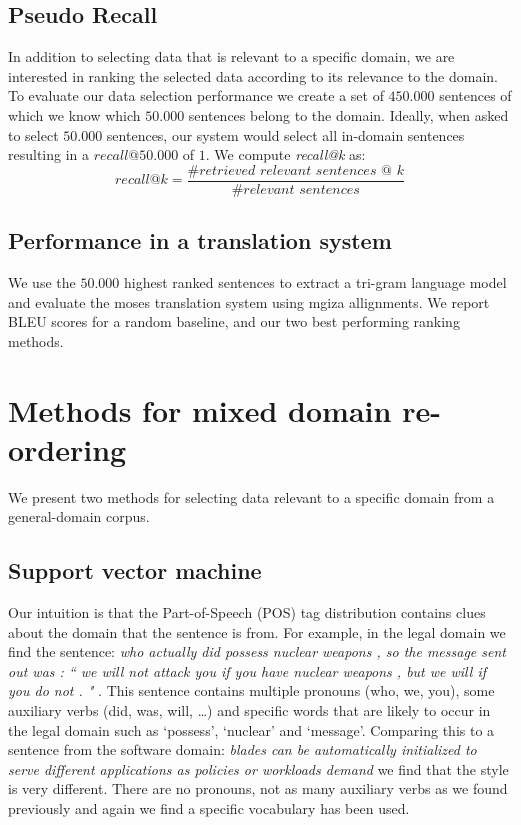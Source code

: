 \documentclass[11pt]{article}
\begin{document}
\subsection{Pseudo Recall}
In addition to selecting data that is relevant to a specific domain, we are interested in ranking the selected data according to its relevance to the domain. To evaluate our data selection performance we create a set of $450.000$ sentences of which we know which $50.000$ sentences belong to the domain. Ideally, when asked to select $50.000$ sentences, our system would select all in-domain sentences resulting in a $\textit{recall@}50.000$ of $1$. We compute \textit{recall@k} as: 
$$ \textit{recall@k} = \frac{\textit{\# retrieved relevant sentences @ k}}{\textit{\# relevant sentences}} $$

\subsection{Performance in a translation system}
We use the $50.000$ highest ranked sentences to extract a tri-gram language model and evaluate the moses translation system using mgiza allignments. We report BLEU scores for a random baseline, and our two best performing ranking methods.

\section{Methods for mixed domain re-ordering}
\label{sec:methods}
We present two methods for selecting data relevant to a specific domain from a general-domain corpus.

\subsection{Support vector machine}
Our intuition is that the Part-of-Speech (POS) tag distribution contains clues about the domain that the sentence is from. For example, in the legal domain we find the sentence: \textit{who actually did possess nuclear weapons , so the message sent out was : `` we will not attack you if you have nuclear weapons , but we will if you do not . " }. This sentence contains multiple pronouns (who, we, you), some auxiliary verbs (did, was, will, \dots) and specific words that are likely to occur in the legal domain such as `possess', `nuclear' and `message'. Comparing this to a sentence from the software domain: 
\textit{blades can be automatically initialized to serve different applications as policies or workloads demand} we find that the style is very different. There are no pronouns, not as many auxiliary verbs as we found previously and again we find a specific vocabulary has been used.\\
\end{document}
